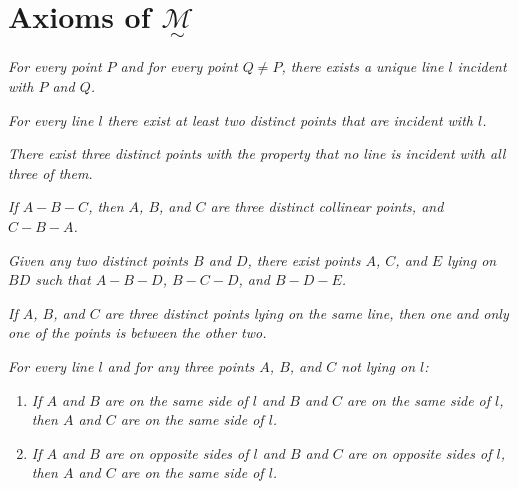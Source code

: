 \documentclass[11pt,a4paper]{article}
\theoremstyle{definition}
\theoremstyle{remark}
\numberwithin{equation}{section}
\newcommand{\MG}{\underset{\sim}{\mathcal{M}}} %
\begin{document}
\section*{Axioms of $\MG$}
\begin{enumerate}[label=\textrm{[}\textbf{I}\arabic*\textrm{]}]
  \item\label{I1} \emph{For every point $P$ and for every point $Q\neq P$, there exists a unique line $l$ incident with $P$ and $Q$.}

  \item\label{I2} \emph{For every line $l$ there exist at least two distinct points that are incident with $l$.}

  \item\label{I3} \emph{There exist three distinct points with the property that no line is incident with all three of them.}
\end{enumerate}

\begin{enumerate}[label=\textrm{[}\textbf{O}\arabic*\textrm{]}]
  \item\label{O1} \emph{If $A-B-C$, then $A$, $B$, and $C$ are three distinct collinear points, and $C-B-A$.}

  \item\label{O2} \emph{Given any two distinct points $B$ and $D$, there exist points $A$, $C$, and $E$ lying on $BD$ such that
  $A-B-D$, $B-C-D$, and $B-D-E$.}

  \item\label{O3} \emph{If $A$, $B$, and $C$ are three distinct points lying on the same line, then one and only one of the points is between the other two.}

  \item\label{O4} \emph{For every line $l$ and for any three points $A$, $B$, and $C$ not lying on $l$:}
  \begin{enumerate}[label=(\roman*)]
    \item \emph{If $A$ and $B$ are on the same side of $l$ and $B$ and $C$ are on the same side of $l$, then $A$ and $C$ are on the same side of $l$.}

    \item \emph{If $A$ and $B$ are on opposite sides of $l$ and $B$ and $C$ are on opposite sides of $l$, then $A$ and $C$ are on the same side of $l$.}
  \end{enumerate}
\end{enumerate}
\end{document}
